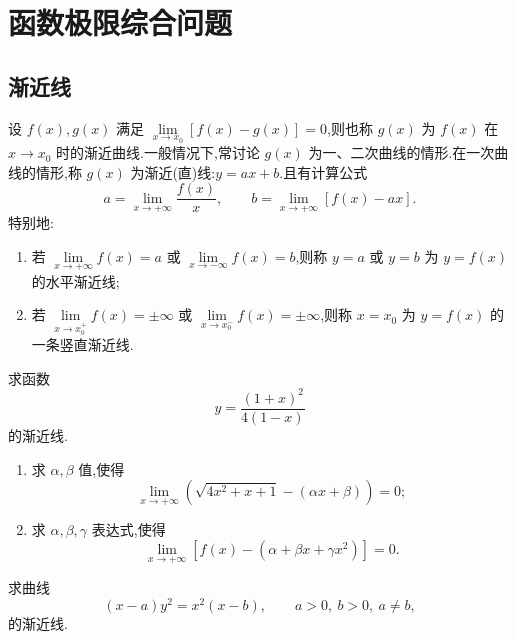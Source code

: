 \documentclass[../数学分析培优讲义.tex]{subfiles}
\begin{document}
\newpage

\section{函数极限综合问题}


\subsection{渐近线}

设 $f(x),g(x)$ 满足
$\displaystyle\lim\limits_{x\to x_0}[f(x)-g(x)]=0$,则也称 $g(x)$ 为 $f(x)$ 在 $x\to x_0$ 时的渐近曲线.一般情况下,常讨论 $g(x)$ 为一、二次曲线的情形.在一次曲线的情形,称 $g(x)$ 为渐近(直)线:$y=ax+b$.且有计算公式
\[
    a=\lim\limits_{x\to+\infty}\dfrac{f(x)}{x},
    \qquad
    b=\lim\limits_{x\to+\infty}[f(x)-ax].
\]
特别地:
\begin{enumerate}[label=\textcircled{\arabic*},leftmargin=2.2em]
    \item 若 $\displaystyle\lim\limits_{x\to+\infty}f(x)=a$ 或
    $\displaystyle\lim\limits_{x\to-\infty}f(x)=b$,则称 $y=a$ 或 $y=b$ 为 $y=f(x)$ 的水平渐近线;
    \item 若 $\displaystyle\lim\limits_{x\to x_0^+}f(x)=\pm\infty$ 或
    $\displaystyle\lim\limits_{x\to x_0^-}f(x)=\pm\infty$,则称 $x=x_0$ 为 $y=f(x)$ 的一条竖直渐近线.
\end{enumerate}

\begin{example}
求函数
\[
    y=\dfrac{(1+x)^2}{4(1-x)}
\]
的渐近线.
\end{example}
\exampleblank

\begin{example}
\begin{enumerate}[label=(\arabic*)]
    \item 求 $\alpha,\beta$ 值,使得
    \[
        \lim\limits_{x\to+\infty}
        \left(\sqrt{4x^2+x+1}-(\alpha x+\beta)\right)=0;
    \]
    \item 求 $\alpha,\beta,\gamma$ 表达式,使得
    \[
        \lim\limits_{x\to+\infty}
        [f(x)-(\alpha+\beta x+\gamma x^2)]=0.
    \]
\end{enumerate}
\end{example}
\exampleblank

\begin{example}
求曲线
\[
    (x-a)y^2=x^2(x-b),
    \qquad a>0,\ b>0,\ a\neq b,
\]
的渐近线.
\end{example}
\exampleblank


\newpage
\end{document}
